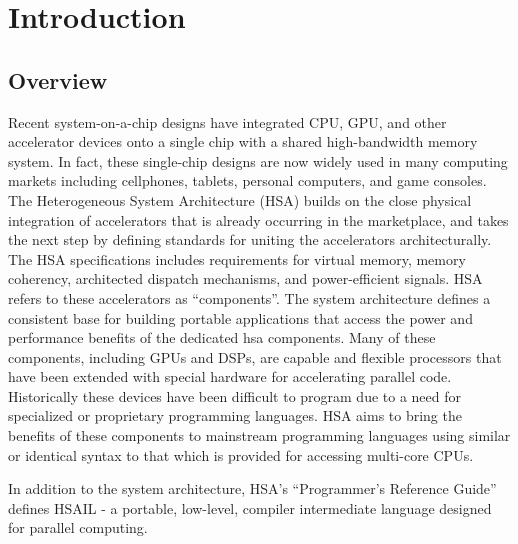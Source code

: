 \documentclass{book}
\begin{document}
\hypersetup{pageanchor=true,citecolor=blue}
\chapter{Introduction} \label{index}\hypertarget{index}{}
\hypertarget{index_overview}{}\section{Overview}\label{index_overview}

Recent system-on-a-chip designs have integrated CPU, GPU, and other
accelerator devices onto a single chip with a shared high-bandwidth
memory system.  In fact, these single-chip designs are now widely
used in many computing markets including cellphones, tablets,
personal computers, and game consoles. The Heterogeneous System
Architecture (HSA) builds on the close physical integration of
accelerators that is already occurring in the marketplace, and takes
the next step by defining standards for uniting the accelerators
architecturally.  The HSA specifications includes requirements for
virtual memory, memory coherency, architected dispatch mechanisms,
and power-efficient signals.
HSA refers to these accelerators as “components”.  The system
architecture defines a consistent base for building portable
applications that access the power and performance benefits of the
dedicated hsa components.   Many of these components, including GPUs
and DSPs, are capable and flexible processors that have been
extended with special hardware for accelerating parallel code.
Historically these devices have been difficult to program due to a
need for specialized or proprietary programming languages.  HSA aims
to bring the benefits of these components to mainstream programming
languages using similar or identical syntax to that which is
provided for accessing multi-core CPUs.

In addition to the system architecture, HSA’s “Programmer’s
Reference Guide” defines HSAIL - a portable, low-level, compiler
intermediate language designed for parallel computing.
\end{document}
